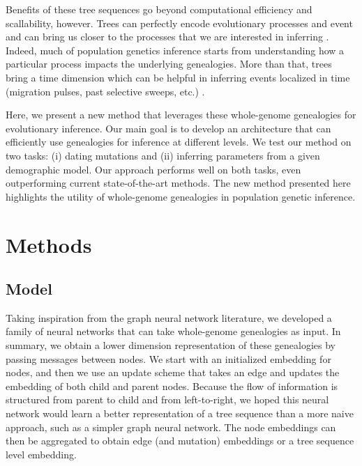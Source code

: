 Benefits of these tree sequences go beyond computational efficiency and scallability, however.
Trees can perfectly encode evolutionary processes and event and can bring us closer to the processes that we are interested in inferring \citep{rasmussen_genome-wide_2014}.
Indeed, much of population genetics inference starts from understanding how a particular process impacts the underlying genealogies.
More than that, trees bring a time dimension which can be helpful in inferring events localized in time (\eg migration pulses, past selective sweeps, etc.) \citep{speidel_inferring_2021}.

Here, we present a new method that leverages these whole-genome genealogies for evolutionary inference.
Our main goal is to develop an architecture that can efficiently use genealogies for inference at different levels.
We test our method on two tasks: (i) dating mutations and (ii) inferring parameters from a given demographic model.
Our approach performs well on both tasks, even outperforming current state-of-the-art methods.
The new method presented here highlights the utility of whole-genome genealogies in population genetic inference.


\section{Methods} \label{sec:methods}

\subsection{Model}
Taking inspiration from the graph neural network literature,
we developed a family of neural networks that can take whole-genome genealogies as input.
In summary, we obtain a lower dimension representation of these genealogies by passing messages between nodes.
We start with an initialized embedding for nodes, and
then we use an update scheme that takes an edge and updates the embedding of both child and parent nodes.
Because the flow of information is structured from parent to child and from left-to-right,
we hoped this neural network would learn a better representation of a tree sequence than a more naive approach,
such as a simpler graph neural network.
The node embeddings can then be aggregated to obtain edge (and mutation) embeddings or a tree sequence level embedding.

